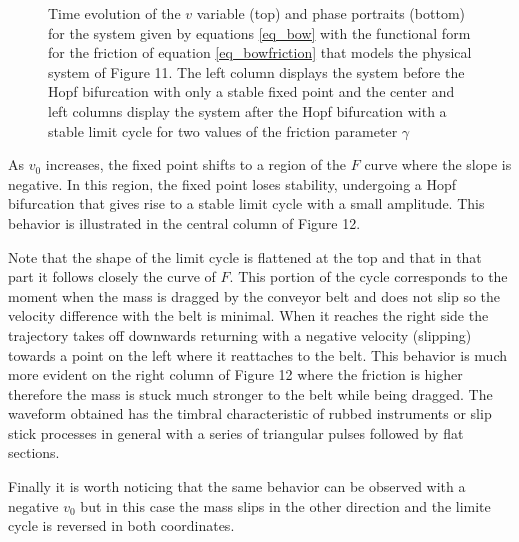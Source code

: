 \documentclass{article}
\begin{document}
\begin{figure}[h]
    \centering
    \caption{Time evolution of the $v$ variable (top) and phase portraits (bottom) for the system given by equations \ref{eq_bow} with the functional form for the friction of equation \ref{eq_bowfriction} that models the physical system of Figure 11. The left column displays the system before the Hopf bifurcation with only a stable fixed point and the center and left columns display the system after the Hopf bifurcation with a stable limit cycle for two values of the friction parameter $\gamma$} 
    \label{fig_bow}
\end{figure}

As $v_0$ increases, the fixed point shifts to a region of the  $F$ curve where the slope is negative. In this region, the fixed point loses stability, undergoing a Hopf bifurcation that gives rise to a stable limit cycle with a small amplitude. 
This behavior is illustrated in the central column of Figure 12.

Note that the shape of the limit cycle is flattened at the top and that in that part it follows closely the curve of $F$. 
This portion of the cycle corresponds to the moment when the mass is dragged by the conveyor belt and does not slip so the velocity difference with the belt is minimal. 
When it reaches the right side the trajectory takes off downwards returning with a negative velocity (slipping) towards a point on the left where it reattaches to the belt. 
This behavior is much more evident on the right column of Figure 12 where the friction is higher therefore the mass is stuck much stronger to the belt while being dragged. 
The waveform obtained has the timbral characteristic of rubbed instruments or slip stick processes in general with a series of triangular pulses followed by flat sections.

Finally it is worth noticing that the same behavior can be observed with a negative $v_0$ but in this case the mass slips in the other direction and the limite cycle is reversed in both coordinates.
\end{document}
